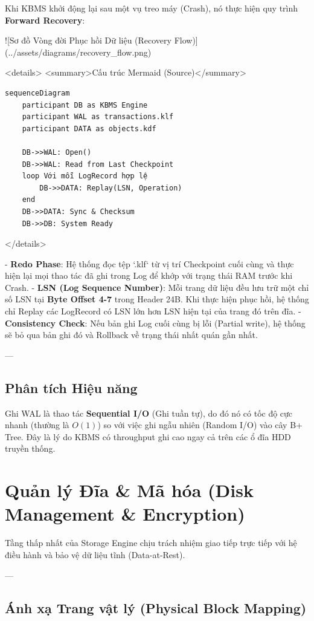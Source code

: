 Khi KBMS khởi động lại sau một vụ treo máy (Crash), nó thực hiện quy trình \textbf{Forward Recovery}:

![Sơ đồ Vòng đời Phục hồi Dữ liệu (Recovery Flow)](../assets/diagrams/recovery\_flow.png)

<details>
<summary>Cấu trúc Mermaid (Source)</summary>

\begin{verbatim}
sequenceDiagram
    participant DB as KBMS Engine
    participant WAL as transactions.klf
    participant DATA as objects.kdf

    DB->>WAL: Open()
    DB->>WAL: Read from Last Checkpoint
    loop Với mỗi LogRecord hợp lệ
        DB->>DATA: Replay(LSN, Operation)
    end
    DB->>DATA: Sync & Checksum
    DB->>DB: System Ready
\end{verbatim}
</details>

-   \textbf{Redo Phase}: Hệ thống đọc tệp `.klf` từ vị trí Checkpoint cuối cùng và thực hiện lại mọi thao tác đã ghi trong Log để khớp với trạng thái RAM trước khi Crash.
-   \textbf{LSN (Log Sequence Number)}: Mỗi trang dữ liệu đều lưu trữ một chỉ số LSN tại \textbf{Byte Offset 4-7} trong Header 24B. Khi thực hiện phục hồi, hệ thống chỉ Replay các LogRecord có LSN lớn hơn LSN hiện tại của trang đó trên đĩa.
-   \textbf{Consistency Check}: Nếu bản ghi Log cuối cùng bị lỗi (Partial write), hệ thống sẽ bỏ qua bản ghi đó và Rollback về trạng thái nhất quán gần nhất.

---

\subsection{Phân tích Hiệu năng}

Ghi WAL là thao tác \textbf{Sequential I/O} (Ghi tuần tự), do đó nó có tốc độ cực nhanh (thường là $O(1)$) so với việc ghi ngẫu nhiên (Random I/O) vào cây B+ Tree. Đây là lý do KBMS có throughput ghi cao ngay cả trên các ổ đĩa HDD truyền thống.

\section{Quản lý Đĩa & Mã hóa (Disk Management & Encryption)}

Tầng thấp nhất của Storage Engine chịu trách nhiệm giao tiếp trực tiếp với hệ điều hành và bảo vệ dữ liệu tĩnh (Data-at-Rest).

---

\subsection{Ánh xạ Trang vật lý (Physical Block Mapping)}

